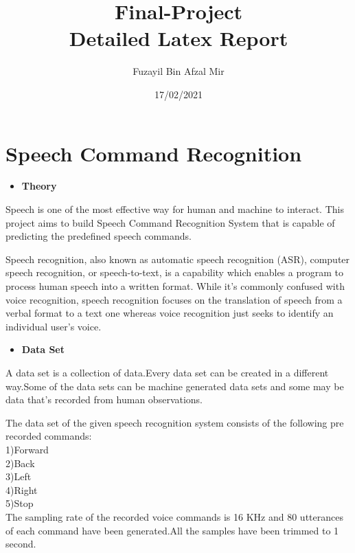 \documentclass[a4paper,12pt]{article}
\title{Final-Project\\Detailed Latex Report}
\author{Fuzayil Bin Afzal Mir}
\date{17/02/2021}
\begin{document}
	\maketitle
	
	
	\newpage

    \section{Speech Command Recognition}
	
	
	 \begin{itemize}
	    \item \Large\textbf{Theory}
	    	\end{itemize}
	Speech is one of the most effective way for human and machine to interact. This project aims to build Speech Command Recognition System that is capable of predicting the predefined speech commands.


Speech recognition, also known as automatic speech recognition (ASR), computer speech recognition, or speech-to-text, is a capability which enables a program to process human speech into a written format. While it’s commonly confused with voice recognition, speech recognition focuses on the translation of speech from a verbal format to a text one whereas voice recognition just seeks to identify an individual user’s voice.
	
	
\begin{itemize}
	    \item \Large\textbf{Data Set}
	    	\end{itemize}	
	A data set is a collection of data.Every data set can be created in a different way.Some of the data sets can be machine generated data sets and some may be data that's recorded from human observations. 
	
	The data set of the given speech recognition system consists of the following pre recorded commands:\\
	
	
	1)Forward\\

	2)Back \\

	3)Left\\

	4)Right\\

	5)Stop\\
	
	The sampling rate of the recorded voice commands is 16 KHz and 80 utterances of each command have been generated.All the samples have been trimmed to 1 second.
	
\end{document}
